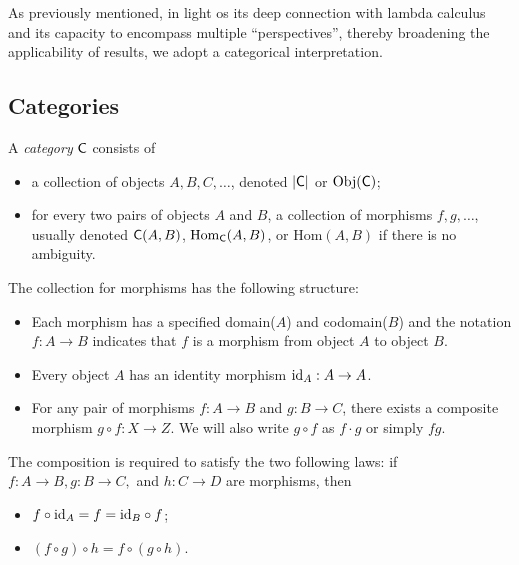  As previously mentioned, in light os its deep connection with lambda calculus and its capacity to encompass multiple ``perspectives'', thereby broadening the applicability of results, we adopt a categorical interpretation.



\subsection{Categories}

\begin{definition}
   A \emph{category} $\mathsf{C}$ consists of
   \begin{itemize}
    \item a collection of objects $A, B, C, \ldots$, denoted $|\mathsf{C}|$ or $\text{Obj}(\mathsf{C})$;
    \item for every two pairs of objects $A$ and $B$, a collection of morphisms $f, g, \ldots $, usually denoted $\mathsf{C}(A,B)$, $\mathrm{Hom}_{\mathsf{C}}(A,B)$, or $\mathrm{Hom}(A,B)$ if there is no ambiguity. 
   \end{itemize}
    The collection for morphisms has the following structure:
    \begin{itemize}
      \item Each morphism has a specified domain($A$) and codomain($B$) and the notation $ f : A \to B $ indicates that $ f $ is a morphism from object $ A $ to object $ B $.  
       \item Every object $ A $ has an identity morphism $ \mathrm{id}_A : A \to A $.  
      \item For any pair of morphisms $ f : A \to B $ and $ g : B \to C $, there exists a composite morphism $ g \circ f : X \to Z $. We will also write $g \circ f$ as $f \cdot g$ or simply $f g$.
    \end{itemize}

     The composition is required to satisfy the two following laws: if $f : A \to B, g : B \to C,$ and $h:C \to D$ are morphisms, then
     \begin{itemize}
      \item  $f \circ \mathrm{id}_A = f = \mathrm{id}_B \circ f$;
      \item  $  (f \circ g) \circ h = f \circ (g \circ h) $.
     \end{itemize}
\end{definition}





